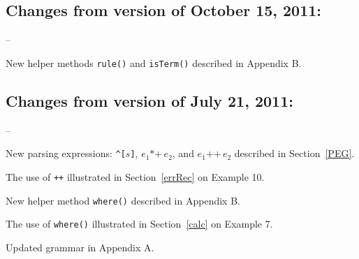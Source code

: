 \documentclass[a4paper,fleqn]{article}
\newcommand{\tx}[1]{\texttt{#1}}
\newcommand{\ul}
{\begin{list}
{--}
 {\setlength{\topsep}{0.5ex}
  \setlength{\itemsep}{0ex}
  \setlength{\parsep}{0ex}
  \setlength{\itemindent}{0em}
  \setlength{\labelwidth}{1em}
  \setlength{\labelsep}{0.5em}
  \setlength{\leftmargin}{1.5em}
 }
}
\newcommand{\eul}{\end{list}}
\begin{document}
\subsection*{Changes from version of October 15, 2011:}
\ul
\item New helper methods \tx{rule()} and \tx{isTerm()} described in Appendix B.
\eul
\subsection*{Changes from version of July 21, 2011:}
\ul
\item New parsing expressions: \tx{\textasciicircum[}$s$\tx{]}, 
      $e_1\tx{*+}\,e_2$, and $e_1\tx{++}\,e_2$  
      described in Section~\ref{PEG}.
\item The use of \tx{++} illustrated in Section~\ref{errRec} on Example 10.
\item New helper method \tx{where()} described in Appendix B.
\item The use of \tx{where()} illustrated in Section~\ref{calc}
      on Example 7.
\item Updated grammar in Appendix A.      
\eul

\newpage
\pagestyle{plain}
\setcounter{page}{1}











\newpage




\end{document}
